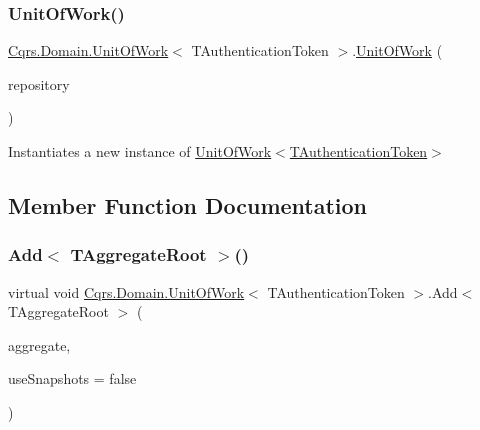\subsubsection{\texorpdfstring{Unit\+Of\+Work()}{UnitOfWork()}\hspace{0.1cm}{\footnotesize\ttfamily [2/2]}}
{\footnotesize\ttfamily \hyperlink{classCqrs_1_1Domain_1_1UnitOfWork}{Cqrs.\+Domain.\+Unit\+Of\+Work}$<$ T\+Authentication\+Token $>$.\hyperlink{classCqrs_1_1Domain_1_1UnitOfWork}{Unit\+Of\+Work} (\begin{DoxyParamCaption}\item[{\hyperlink{interfaceCqrs_1_1Domain_1_1IAggregateRepository}{I\+Aggregate\+Repository}$<$ T\+Authentication\+Token $>$}]{repository }\end{DoxyParamCaption})}



Instantiates a new instance of \hyperlink{classCqrs_1_1Domain_1_1UnitOfWork_a9ec92dbd580f3885f7cf5a9ad360e1ac_a9ec92dbd580f3885f7cf5a9ad360e1ac}{Unit\+Of\+Work$<$\+T\+Authentication\+Token$>$} 



\subsection{Member Function Documentation}
\mbox{\label{classCqrs_1_1Domain_1_1UnitOfWork_a91bd702e09fb175e7b6bb4ee2a66bb61_a91bd702e09fb175e7b6bb4ee2a66bb61}} 
\subsubsection{\texorpdfstring{Add$<$ T\+Aggregate\+Root $>$()}{Add< TAggregateRoot >()}}
{\footnotesize\ttfamily virtual void \hyperlink{classCqrs_1_1Domain_1_1UnitOfWork}{Cqrs.\+Domain.\+Unit\+Of\+Work}$<$ T\+Authentication\+Token $>$.Add$<$ T\+Aggregate\+Root $>$ (\begin{DoxyParamCaption}\item[{T\+Aggregate\+Root}]{aggregate,  }\item[{bool}]{use\+Snapshots = {\ttfamily false} }\end{DoxyParamCaption})\hspace{0.3cm}{\ttfamily [virtual]}}



